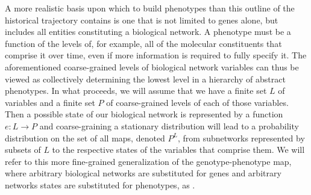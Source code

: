 A more realistic basis upon which to build phenotypes than this outline of the historical trajectory contains is one that is not limited to genes alone, but includes all entities constituting a biological network. A phenotype must be a function of the levels of, for example, all of the molecular constituents that comprise it over time, even if more information is required to fully specify it.  The aforementioned coarse-grained levels of biological network variables can thus be viewed as collectively determining the lowest level in a hierarchy of abstract phenotypes. In what proceeds, we will assume that we have a finite set $L$ of variables and a finite set $P$ of coarse-grained levels of each of those variables.
Then a possible state of our biological network is represented by a function $e : L \to P$ and coarse-graining a stationary distribution will lead to a probability distribution on the set of all maps, denoted $P^L$, from subnetworks represented by subsets of $L$ to the respective states of the variables that comprise them. We will refer to this more fine-grained generalization of the genotype-phenotype map, where arbitrary biological networks are substituted for genes and arbitrary networks states are substituted for phenotypes, as \gnpm{}.




